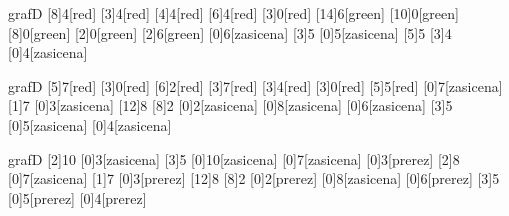 \documentclass[14pt]{extarticle}
\begin{document}
\begin{pretok}{grafD}
    \nicle
    [8]{4}[red]
    [3]{4}[red]
    [4]{4}[red]
    [6]{4}[red]
    [3]{0}[red]
    [14]{6}[green]
    [10]{0}[green]
    [8]{0}[green]
    [2]{0}[green]
    [2]{6}[green]
    [0]{6}[zasicena]
    [3]{5}
    [0]{5}[zasicena]
    [5]{5}
    [3]{4}
    [0]{4}[zasicena]

\end{pretok}

\begin{pretok}{grafD}
    \nicle
    [5]{7}[red]
    [3]{0}[red]
    [6]{2}[red]
    [3]{7}[red]
    [3]{4}[red]
    [3]{0}[red]
    [5]{5}[red]
    [0]{7}[zasicena]
    [1]{7}
    [0]{3}[zasicena]
    [12]{8}
    [8]{2}
    [0]{2}[zasicena]
    [0]{8}[zasicena]
    [0]{6}[zasicena]
    [3]{5}
    [0]{5}[zasicena]
    [0]{4}[zasicena]

\end{pretok}

\begin{pretok}{grafD}
    \nicle
    [2]{10}
    [0]{3}[zasicena]
    [3]{5}
    [0]{10}[zasicena]
    [0]{7}[zasicena]
    [0]{3}[prerez]
    [2]{8}
    [0]{7}[zasicena]
    [1]{7}
    [0]{3}[prerez]
    [12]{8}
    [8]{2}
    [0]{2}[prerez]
    [0]{8}[zasicena]
    [0]{6}[prerez]
    [3]{5}
    [0]{5}[prerez]
    [0]{4}[prerez]


\end{pretok}
\end{document}
